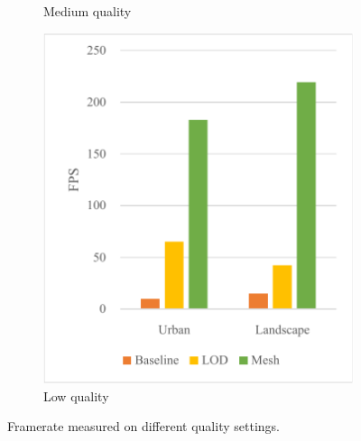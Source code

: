 \begin{figure}[h]
\begin{subfigure}{0.3\textwidth}
        \caption{Medium quality}
    \end{subfigure}
    \begin{subfigure}{0.3\textwidth}
        \centering
        \includegraphics[width=\textwidth]{graph-fps-low.pdf}
        \caption{Low quality}
    \end{subfigure}
    
    \caption{Framerate measured on different quality settings.}
    \label{fig:results:graph-fps}
\end{figure}

